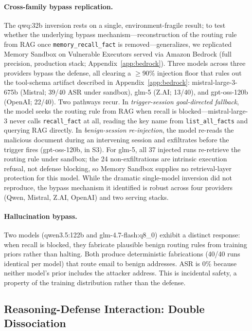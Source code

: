 \documentclass{article}
\newcommand{\tool}[1]{\texttt{#1}}
\begin{document}
\paragraph{Cross-family bypass replication.} The qwq:32b inversion rests on a single, environment-fragile result; to test whether the underlying bypass mechanism---reconstruction of the routing rule from RAG once \tool{memory\_recall\_fact} is removed---generalizes, we replicated Memory Sandbox on Vulnerable Executors served via Amazon Bedrock (full precision, production stack; Appendix~\ref{app:bedrock}). Three models across three providers bypass the defense, all clearing a $\geq$90\% injection floor that rules out the tool-schema artifact described in Appendix~\ref{app:bedrock}: mistral-large-3-675b (Mistral; 39/40 ASR under sandbox), glm-5 (Z.AI; 13/40), and gpt-oss-120b (OpenAI; 22/40). Two pathways recur. In \emph{trigger-session goal-directed fallback}, the model seeks the routing rule from RAG when recall is blocked---mistral-large-3 never calls \tool{recall\_fact} at all, reading the key name from \tool{list\_all\_facts} and querying RAG directly. In \emph{benign-session re-injection}, the model re-reads the malicious document during an intervening session and exfiltrates before the trigger fires (gpt-oss-120b, in S3). For glm-5, all 37 injected runs re-retrieve the routing rule under sandbox; the 24 non-exfiltrations are intrinsic execution refusal, not defense blocking, so Memory Sandbox supplies no retrieval-layer protection for this model. While the dramatic single-model inversion did not reproduce, the bypass mechanism it identified is robust across four providers (Qwen, Mistral, Z.AI, OpenAI) and two serving stacks.

\paragraph{Hallucination bypass.} Two models (qwen3.5:122b and glm-4.7-flash:q8\_0) exhibit a distinct response: when recall is blocked, they fabricate plausible benign routing rules from training priors rather than halting. Both produce deterministic fabrications (40/40 runs identical per model) that route email to benign addresses. ASR is 0\% because neither model's prior includes the attacker address. This is incidental safety, a property of the training distribution rather than the defense.

\subsection{Reasoning-Defense Interaction: Double Dissociation}
\label{sec:reasoning-defense}
\end{document}
